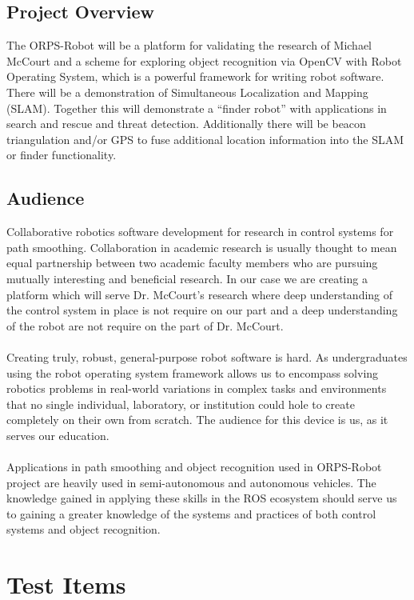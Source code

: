 \documentclass[english,12pt]{article}
\begin{document}
\subsection{Project Overview}
The ORPS-Robot will be a platform for validating the research of Michael McCourt 
and a scheme for exploring object recognition via OpenCV with Robot Operating System, 
which is a powerful framework for writing robot software. There will be a demonstration 
of Simultaneous Localization and Mapping (SLAM). Together this will demonstrate a ``finder
robot'' with applications in search and rescue and threat detection. Additionally there 
will be beacon triangulation and/or GPS to fuse additional location information into the 
SLAM or finder functionality.

\subsection{Audience}
Collaborative robotics software development for research in control systems 
for path smoothing. Collaboration in academic research is usually thought to mean 
equal partnership between two academic faculty members who are pursuing mutually 
interesting and beneficial research. In our case we are creating a platform which 
will serve Dr. McCourt's research where deep understanding of the control system in 
place is not require on our part and a deep understanding of the robot are not 
require on the part of Dr. McCourt.\\\\
Creating truly, robust, general-purpose robot software is hard. As 
undergraduates using the robot operating system framework allows us to encompass 
solving robotics problems in real-world variations in complex tasks and 
environments that no single individual, laboratory, or institution could 
hole to create completely on their own from scratch. The audience for this 
device is us, as it serves our education.\\\\
Applications in path smoothing and object recognition used in 
ORPS-Robot project are heavily used in semi-autonomous and autonomous 
vehicles. The knowledge gained in applying these skills in the ROS ecosystem 
should serve us to gaining a greater knowledge of the systems and 
practices of both control systems and object recognition.
\section{Test Items}
\end{document}
